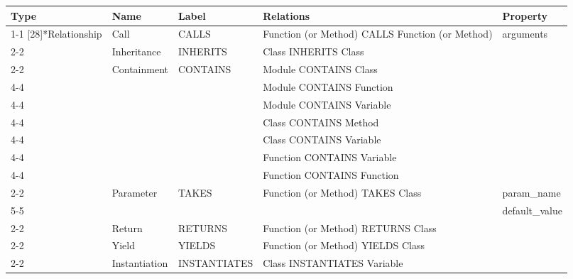 \vspace{0.8cm}

\begin{tabularx}{\textwidth}{p{1.8cm}llXl}
\toprule
\textbf{Type} & \textbf{Name} & \textbf{Label} & \textbf{Relations} & \textbf{Property} \\
\cmidrule{1-1}\cmidrule{2-2}\cmidrule{3-3}\cmidrule{4-4}\cmidrule{5-5}
\multirow{14}[28]{*}{Relationship} & Call & \textsf{CALLS} & \textsf{Function} (or \textsf{Method}) \textsf{CALLS} \textsf{Function} (or \textsf{Method}) & \textsf{arguments} \\
\cmidrule{2-2}\cmidrule{3-3}\cmidrule{4-4}\cmidrule{5-5}
 & Inheritance & \textsf{INHERITS} & \textsf{Class} \textsf{INHERITS} \textsf{Class} &  \\
\cmidrule{2-2}\cmidrule{3-3}\cmidrule{4-4}
 & \multirow{7}[14]{*}{Containment} & \multirow{7}[14]{*}{\textsf{CONTAINS}} & \textsf{Module} \textsf{CONTAINS} \textsf{Class} &  \\
\cmidrule{4-4}
 &  &  & \textsf{Module} \textsf{CONTAINS} \textsf{Function} &  \\
\cmidrule{4-4}
 &  &  & \textsf{Module} \textsf{CONTAINS} \textsf{Variable} &  \\
\cmidrule{4-4}
 &  &  & \textsf{Class} \textsf{CONTAINS} \textsf{Method} &  \\
\cmidrule{4-4}
 &  &  & \textsf{Class} \textsf{CONTAINS} \textsf{Variable} &  \\
\cmidrule{4-4}
 &  &  & \textsf{Function} \textsf{CONTAINS} \textsf{Variable} &  \\
\cmidrule{4-4}
 &  &  & \textsf{Function} \textsf{CONTAINS} \textsf{Function} &  \\
\cmidrule{2-2}\cmidrule{3-3}\cmidrule{4-4}\cmidrule{5-5}
 & \multirow{2}[4]{*}{Parameter} & \multirow{2}[4]{*}{\textsf{TAKES}} & \multirow{2}[4]{*}{\textsf{Function} (or \textsf{Method}) \textsf{TAKES} \textsf{Class}} & \textsf{param\_\textsf{name}} \\
\cmidrule{5-5}
 &  &  &  & \textsf{default\_value} \\
\cmidrule{2-2}\cmidrule{3-3}\cmidrule{4-4}\cmidrule{5-5}
 & Return & \textsf{RETURNS} & \textsf{Function} (or \textsf{Method}) \textsf{RETURNS} \textsf{Class} &  \\
\cmidrule{2-2}\cmidrule{3-3}\cmidrule{4-4}
 & Yield & \textsf{YIELDS} & \textsf{Function} (or \textsf{Method}) \textsf{YIELDS} \textsf{Class} &  \\
\cmidrule{2-2}\cmidrule{3-3}\cmidrule{4-4}
 & Instantiation & \textsf{INSTANTIATES} & \textsf{Class} \textsf{INSTANTIATES} \textsf{Variable} &  \\
\bottomrule
\end{tabularx}


